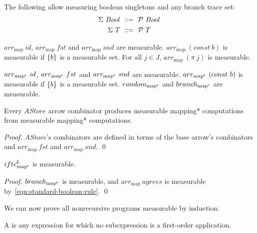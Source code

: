 \documentclass{llncs}
\newcommand{\conv}{^{\mspace{-2mu}\Downarrow\mspace{-2mu}}}
\newcommand{\arrowarr}{\ensuremath{arr}}
\newcommand{\arrowconvif}{\ensuremath{ifte\conv}}
\newcommand{\map}{_\mathrm{map}}
\newcommand{\arrmap}{\arrowarr\map}
\newcommand{\pmap}{_\mathrm{map^{\mspace{-2mu}*}}}
\newcommand{\arrpmap}{\arrowarr\pmap}
\newcommand{\convifpmap}{\arrowconvif\pmap}
\begin{document}
The following allow measuring boolean singletons and any branch trace set:
\begin{align}
	\Sigma~Bool &\ ::=\ \mathcal{P}~Bool
	\label{eqn:standard-boolean-rule}
\\
	\Sigma~T &\ ::=\ \mathcal{P}~T
	\label{eqn:standard-traces-rule}
\end{align}

\begin{lemma}
$\arrmap~id$, $\arrmap~fst$ and $\arrmap~snd$ are measurable.
$\arrmap~(const~b)$ is measurable if $\{{b}\}$ is a measurable set.
For all $j \in J$, $\arrmap~(\pi~j)$ is measurable.
\end{lemma}


\begin{corollary}
$\arrpmap~id$, $\arrpmap~fst$ and $\arrpmap~snd$ are measurable.
$\arrpmap~(const~b)$ is measurable if $\{{b}\}$ is a measurable set.
$random\pmap$ and $branch\pmap$ are measurable.
\end{corollary}

\begin{theorem}
\label{thm:astore-measurability-transfer}
Every $AStore$ arrow combinator produces measurable mapping* computations from measurable mapping* computations.%
\end{theorem}
\begin{proof}
$AStore$'s combinators are defined in terms of the base arrow's combinators and $\arrmap~fst$ and $\arrmap~snd$.
\qed
\end{proof}

\begin{theorem}[$\convifpmap$ measurability]
$\convifpmap$ is measurable.
\end{theorem}
\begin{proof}
$branch\pmap$ is measurable, and $\arrmap~agrees$ is measurable by~\eqref{eqn:standard-boolean-rule}.
\qed
\end{proof}

We can now prove all nonrecursive programs measurable by induction.

\begin{definition}
\label{def:finite-expression}
A  is any expression for which no subexpression is a first-order application.%
\end{definition}
\end{document}
